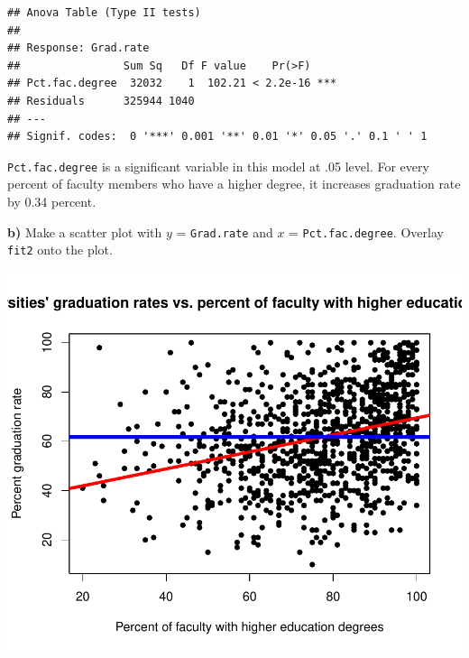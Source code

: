 \documentclass[]{article}
\newenvironment{Shaded}{\begin{snugshade}}{\end{snugshade}}
\newcommand{\KeywordTok}[1]{\textcolor[rgb]{0.13,0.29,0.53}{\textbf{#1}}}
\newcommand{\DataTypeTok}[1]{\textcolor[rgb]{0.13,0.29,0.53}{#1}}
\newcommand{\DecValTok}[1]{\textcolor[rgb]{0.00,0.00,0.81}{#1}}
\newcommand{\StringTok}[1]{\textcolor[rgb]{0.31,0.60,0.02}{#1}}
\newcommand{\CommentTok}[1]{\textcolor[rgb]{0.56,0.35,0.01}{\textit{#1}}}
\newcommand{\OperatorTok}[1]{\textcolor[rgb]{0.81,0.36,0.00}{\textbf{#1}}}
\newcommand{\NormalTok}[1]{#1}
\begin{document}
\begin{verbatim}
## Anova Table (Type II tests)
## 
## Response: Grad.rate
##                Sum Sq   Df F value    Pr(>F)    
## Pct.fac.degree  32032    1  102.21 < 2.2e-16 ***
## Residuals      325944 1040                      
## ---
## Signif. codes:  0 '***' 0.001 '**' 0.01 '*' 0.05 '.' 0.1 ' ' 1
\end{verbatim}

\texttt{Pct.fac.degree} is a significant variable in this model at .05
level. For every percent of faculty members who have a higher degree, it
increases graduation rate by 0.34 percent.

\textbf{b)} Make a scatter plot with \(y\) = \texttt{Grad.rate} and
\(x\) = \texttt{Pct.fac.degree}. Overlay \texttt{fit2} onto the plot.

\begin{Shaded}
\end{Shaded}

\begin{flushleft}\includegraphics{Midterm_11_01_2016_Answers_files/figure-latex/unnamed-chunk-21-1} \end{flushleft}
\end{document}
